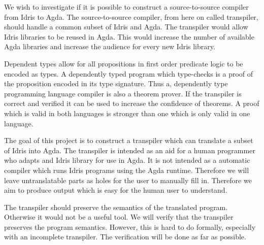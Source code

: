 We wish to investigate if it is possible to construct a source-to-source
compiler from Idris to Agda. The source-to-source compiler, from here on called
transpiler, should handle a common subset of Idris and Agda.  The transpiler
would allow Idris libraries to be reused in Agda. This would increase the
number of available Agda libraries and increase the audience for every new
Idris library.

Dependent types allow for all propositions in first order predicate logic to be
encoded as types. A dependently typed program which type-checks is a proof of
the proposition encoded in its type signature. Thus a, dependently type
programming language compiler is also a theorem prover. If the transpiler is correct and verified it can
be used to increase the confidence of theorems. A proof which is valid in both
languages is stronger than one which is only valid in one language.


The goal of this project is to construct a transpiler which can translate
a subset of Idris into Agda. The transpiler is intended as an aid for
a human programmer who adapts and Idris library for use in Agda.  It is not
intended as a automatic compiler which runs Idris programs using the Agda
runtime. Therefore we will leave untranslatable parts as holes for the user to
manually fill in. Therefore we aim to produce output which is easy for
the human user to understand.



The transpiler should preserve the semantics of the translated program.
Otherwise it would not be a useful tool.  We will verify that the transpiler
preserves the program semantics.  However, this is hard to do formally,
especially with an incomplete transpiler.  The verification will be done as far
as possible.

